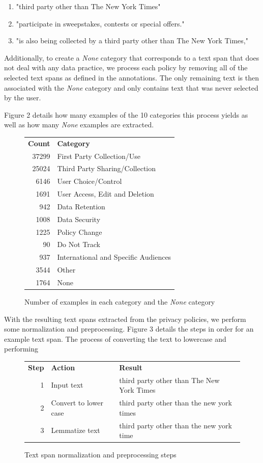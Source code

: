 \documentclass[12pt, letterpaper]{article}
\begin{document}
\begin{enumerate}
	\item "third party other than The New York Times"
	\item "participate in sweepstakes, contests or special offers."
	\item "is also being collected by a third party other than The New York Times,"
\end{enumerate}

Additionally, to create a \textit{None} category that corresponds to a text span that does not deal with any data practice, we process each policy by removing all of the selected text spans as defined in the annotations. The only remaining text is then associated with the \textit{None} category and only contains text that was never selected by the user.

Figure 2 details how many examples of the 10 categories this process yields as well as how many \textit{None} examples are extracted.

\begin{figure}[h]
	\begin{tabular}{rl}
		\textbf{Count} & \textbf{Category} \\
		37299 & First Party Collection/Use \\ 
		25024 & Third Party Sharing/Collection \\
		6146 & User Choice/Control \\
		1691 & User Access, Edit and Deletion \\
		942 & Data Retention \\
		1008 & Data Security \\
		1225 & Policy Change \\
		90 & Do Not Track \\
		937 & International and Specific Audiences \\
		3544 & Other \\
		1764 & None \\
	\end{tabular}
	\caption{Number of examples in each category and the \textit{None} category}
\end{figure}

With the resulting text spans extracted from the privacy policies, we perform some normalization and preprocessing. Figure 3 details the steps in order for an example text span. The process of converting the text to lowercase and performing 

\begin{figure}[h]
	\begin{tabular}{rll}
		\textbf{Step} & \textbf{Action} & \textbf{Result} \\
		1 & Input text & third party other than The New York Times \\ 
		2 & Convert to lower case & third party other than the new york times \\ 
		3 & Lemmatize text & third party other than the new york time \\
	\end{tabular}
\caption{Text span normalization and preprocessing steps}
\end{figure}
\end{document}
